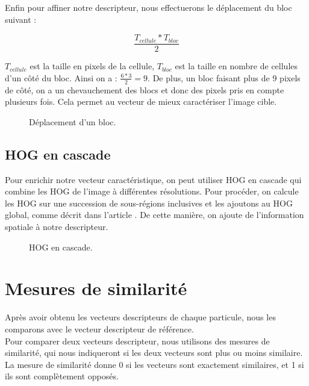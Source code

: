 
Enfin pour affiner notre descripteur, nous effectuerons le déplacement du bloc suivant :

\[ \frac{T_{cellule} * T_{bloc}}{2} \]

$T_{cellule}$ est la taille en pixels de la cellule,
$T_{bloc}$ est la taille en nombre de cellules d'un côté du bloc.
Ainsi on a : $\frac{6*3}{2} = 9$. De plus, un bloc faisant plus de 9 pixels de côté, on a un chevauchement des blocs et donc des pixels pris en compte plusieurs fois. Cela permet au vecteur de mieux caractériser l'image cible.

\begin{figure}[!htbp]
\center
\caption{Déplacement d'un bloc.}
\label{fig:blocOverlap}
\end{figure}
\FloatBarrier

\subsection{HOG en cascade}

Pour enrichir notre vecteur caractéristique, on peut utiliser HOG en cascade qui combine les HOG de l'image à différentes résolutions. Pour procéder, on calcule les HOG sur une succession de sous-régions inclusives et les ajoutons au HOG global, comme décrit dans l'article \cite{qiang_zhu_fast_2006}. De cette manière, on ajoute de l'information spatiale à notre descripteur.

\begin{figure}[!htbp]
\center
\caption{HOG en cascade.}
\label{fig:cuttlefish_hog}
\end{figure}
\FloatBarrier




\section{Mesures de similarité}
Après avoir obtenu les vecteurs descripteurs de chaque particule, nous les comparons avec le vecteur descripteur de référence.\\
Pour comparer deux vecteurs descripteur, nous utilisons des mesures de similarité, qui nous indiqueront si les deux vecteurs sont plus ou moins similaire. La mesure de similarité donne 0 si les vecteurs sont exactement similaires, et 1 si ils sont complètement opposés.

